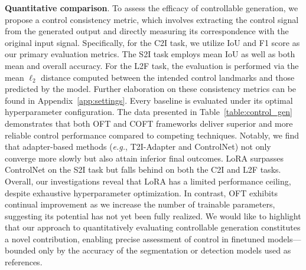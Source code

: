 \textbf{Quantitative comparison}. To assess the efficacy of controllable generation, we propose a control consistency metric, which involves extracting the control signal from the generated output and directly measuring its correspondence with the original input signal. Specifically, for the C2I task, we utilize IoU and F1 score as our primary evaluation metrics. The S2I task employs mean IoU as well as both mean and overall accuracy. For the L2F task, the evaluation is performed via the mean $\ell_2$ distance computed between the intended control landmarks and those predicted by the model. Further elaboration on these consistency metrics can be found in Appendix~\ref{app:settings}. Every baseline is evaluated under its optimal hyperparameter configuration. The data presented in Table~\ref{table:control_gen} demonstrates that both OFT and COFT frameworks deliver superior and more reliable control performance compared to competing techniques. Notably, we find that adapter-based methods (\emph{e.g.}, T2I-Adapter and ControlNet) not only converge more slowly but also attain inferior final outcomes. LoRA surpasses ControlNet on the S2I task but falls behind on both the C2I and L2F tasks. Overall, our investigations reveal that LoRA has a limited performance ceiling, despite exhaustive hyperparameter optimization. In contrast, OFT exhibits continual improvement as we increase the number of trainable parameters, suggesting its potential has not yet been fully realized. We would like to highlight that our approach to quantitatively evaluating controllable generation constitutes a novel contribution, enabling precise assessment of control in finetuned models—bounded only by the accuracy of the segmentation or detection models used as references.

